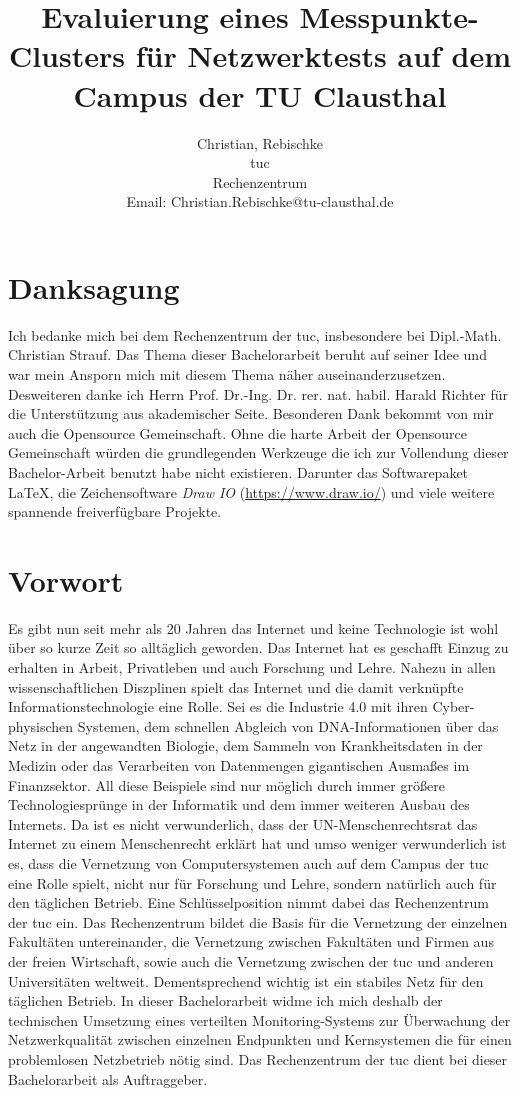 \documentclass[titlepage]{report}
\title{Evaluierung eines Messpunkte-Clusters für Netzwerktests auf dem
Campus der TU Clausthal}
\author{Christian, Rebischke\\
\gls{tuc}\\
Rechenzentrum\\
Email: Christian.Rebischke@tu-clausthal.de}
\begin{document}
\maketitle
\chapter*{Danksagung}
Ich bedanke mich bei dem Rechenzentrum der \gls{tuc}, insbesondere bei
Dipl.\hyp{}Math. Christian Strauf. Das Thema dieser Bachelorarbeit
beruht auf seiner Idee und war mein Ansporn mich mit diesem Thema näher
auseinanderzusetzen. Desweiteren danke ich Herrn Prof. Dr.\hyp{}Ing. Dr.
rer. nat. habil. Harald Richter für die Unterstützung aus akademischer
Seite. Besonderen Dank bekommt von mir auch die Opensource Gemeinschaft.
Ohne die harte Arbeit der Opensource Gemeinschaft würden die grundlegenden
Werkzeuge die ich zur Vollendung dieser Bachelor-Arbeit benutzt habe
nicht existieren. Darunter das Softwarepaket \LaTeX, die Zeichensoftware
\emph{Draw IO} (\url{https://www.draw.io/}) und viele weitere spannende
freiverfügbare Projekte.
\tableofcontents
\chapter*{Vorwort}
Es gibt nun seit mehr als 20 Jahren das Internet und keine Technologie
ist wohl über so kurze Zeit so alltäglich geworden. Das Internet hat es
geschafft Einzug zu erhalten in Arbeit, Privatleben und auch Forschung
und Lehre. Nahezu in allen wissenschaftlichen Diszplinen spielt das
Internet und die damit verknüpfte Informationstechnologie eine Rolle.
Sei es die Industrie 4.0 mit ihren Cyber-physischen Systemen, dem
schnellen Abgleich von DNA-Informationen über das Netz in der
angewandten Biologie, dem Sammeln von Krankheitsdaten in der Medizin
oder das Verarbeiten von Datenmengen gigantischen Ausmaßes im
Finanzsektor. All diese Beispiele sind nur möglich durch immer größere
Technologiesprünge in der Informatik und dem immer weiteren Ausbau des
Internets. Da ist es nicht verwunderlich, dass der UN-Menschenrechtsrat das
Internet zu einem Menschenrecht\cite{UNHRC} erklärt hat und umso weniger
verwunderlich ist es, dass die Vernetzung von Computersystemen auch auf
dem Campus der \gls{tuc} eine Rolle spielt,
nicht nur für Forschung und Lehre, sondern natürlich auch für den
täglichen Betrieb. Eine Schlüsselposition nimmt dabei das Rechenzentrum
der \gls{tuc} ein. Das Rechenzentrum bildet die
Basis für die Vernetzung der einzelnen Fakultäten untereinander, die
Vernetzung zwischen Fakultäten und Firmen aus der freien Wirtschaft,
sowie auch die Vernetzung zwischen der \gls{tuc}
und anderen Universitäten weltweit. Dementsprechend wichtig ist ein
stabiles Netz für den täglichen Betrieb. In dieser Bachelorarbeit widme
ich mich deshalb der technischen Umsetzung eines verteilten
Monitoring-Systems zur Überwachung der Netzwerkqualität zwischen
einzelnen Endpunkten und Kernsystemen die für einen problemlosen
Netzbetrieb nötig sind. Das Rechenzentrum der \gls{tuc} dient bei dieser
Bachelorarbeit als Auftraggeber.
\end{document}
